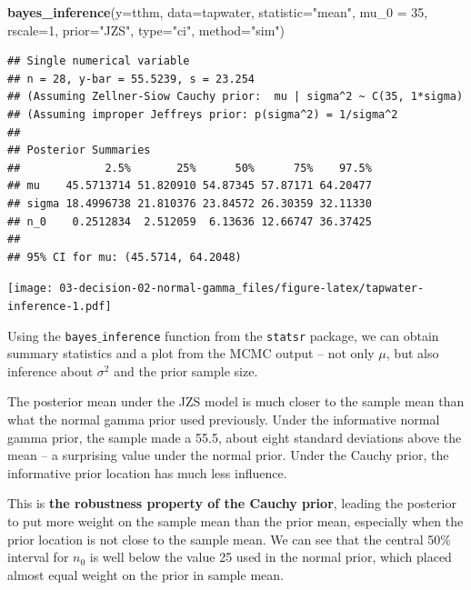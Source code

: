 \documentclass[]{book}
\newenvironment{Shaded}{\begin{snugshade}}{\end{snugshade}}
\newcommand{\KeywordTok}[1]{\textcolor[rgb]{0.13,0.29,0.53}{\textbf{#1}}}
\newcommand{\DataTypeTok}[1]{\textcolor[rgb]{0.13,0.29,0.53}{#1}}
\newcommand{\DecValTok}[1]{\textcolor[rgb]{0.00,0.00,0.81}{#1}}
\newcommand{\StringTok}[1]{\textcolor[rgb]{0.31,0.60,0.02}{#1}}
\newcommand{\NormalTok}[1]{#1}
\theoremstyle{definition}
\theoremstyle{definition}
\theoremstyle{definition}
\theoremstyle{remark}
\begin{document}
\begin{Shaded}
\begin{Highlighting}[]
\KeywordTok{bayes_inference}\NormalTok{(}\DataTypeTok{y=}\NormalTok{tthm, }\DataTypeTok{data=}\NormalTok{tapwater, }\DataTypeTok{statistic=}\StringTok{"mean"}\NormalTok{,}
                \DataTypeTok{mu_0 =} \DecValTok{35}\NormalTok{, }\DataTypeTok{rscale=}\DecValTok{1}\NormalTok{, }\DataTypeTok{prior=}\StringTok{"JZS"}\NormalTok{,}
                \DataTypeTok{type=}\StringTok{"ci"}\NormalTok{, }\DataTypeTok{method=}\StringTok{"sim"}\NormalTok{)}
\end{Highlighting}
\end{Shaded}

\begin{verbatim}
## Single numerical variable
## n = 28, y-bar = 55.5239, s = 23.254
## (Assuming Zellner-Siow Cauchy prior:  mu | sigma^2 ~ C(35, 1*sigma)
## (Assuming improper Jeffreys prior: p(sigma^2) = 1/sigma^2
## 
## Posterior Summaries
##             2.5%       25%      50%      75%    97.5%
## mu    45.5713714 51.820910 54.87345 57.87171 64.20477
## sigma 18.4996738 21.810376 23.84572 26.30359 32.11330
## n_0    0.2512834  2.512059  6.13636 12.66747 36.37425
## 
## 95% CI for mu: (45.5714, 64.2048)
\end{verbatim}

\texttt{[image: 03-decision-02-normal-gamma\_files/figure-latex/tapwater-inference-1.pdf]}

Using the \texttt{bayes$\_$inference} function from the \texttt{statsr}
package, we can obtain summary statistics and a plot from the MCMC
output -- not only \(\mu\), but also inference about \(\sigma^2\) and
the prior sample size.

The posterior mean under the JZS model is much closer to the sample mean
than what the normal gamma prior used previously. Under the informative
normal gamma prior, the sample made a 55.5, about eight standard
deviations above the mean -- a surprising value under the normal prior.
Under the Cauchy prior, the informative prior location has much less
influence.

This is \textbf{the robustness property of the Cauchy prior}, leading
the posterior to put more weight on the sample mean than the prior mean,
especially when the prior location is not close to the sample mean. We
can see that the central 50\% interval for \(n_0\) is well below the
value 25 used in the normal prior, which placed almost equal weight on
the prior in sample mean.
\end{document}
